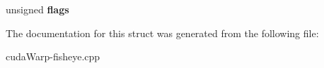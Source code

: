 \begin{DoxyCompactItemize}
\begin{tabbing}
\end{tabbing}\item 
unsigned {\bfseries flags}\hypertarget{structCUDA__RESOURCE__DESC__st_a3894ce042867d22801bfab9bf563208d}{}\label{structCUDA__RESOURCE__DESC__st_a3894ce042867d22801bfab9bf563208d}

\end{DoxyCompactItemize}


The documentation for this struct was generated from the following file\+:\begin{DoxyCompactItemize}
\item 
cuda\+Warp-\/fisheye.\+cpp\end{DoxyCompactItemize}
